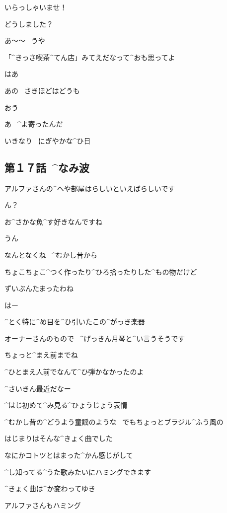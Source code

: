 \page
\Kokone いらっしゃいませ！

\Alpha どうしました？

\Ojisan あ〜〜
\ うや

\Ojisan 「^{きっさ}{喫茶}^{てん}{店}」みてえだなって^{おも}{思}ってよ

\Alpha はあ

\page
\Kokone あの
\ さきほどはどうも

\Ojisan おう

\Alpha あ
\ ^{よ}{寄}ったんだ

\Alpha いきなり
\ にぎやかな^{ひ}{日}


\subsection{第１７話\ ^{なみ}{波}}

\page[20]
\Kokone アルファさんの^{へや}{部屋}はらしいといえばらしいです

\page
\Alpha ん？

\Kokone お^{さかな}{魚}^{す}{好}きなんですね

\Alpha うん

\Alpha なんとなくね
\ ^{むかし}{昔}から

\page
\Alpha ちょこちょこ^{つく}{作}ったり^{ひろ}{拾}ったりした^{もの}{物}だけど

\Alpha ずいぶんたまったわね

\Kokone はー

\Kokone ^{とく}{特}に^{め}{目}を^{ひ}{引}いたこの^{がっき}{楽器}

\Kokone オーナーさんのもので
\ ^{げっきん}{月琴}と^{い}{言}うそうです

\page
\Alpha ちょっと^{まえ}{前}までね

\Alpha ^{ひとまえ}{人前}でなんて^{ひ}{弾}かなかったのよ

\Alpha ^{さいきん}{最近}だなー

\page
\Kokone ^{はじ}{初}めて^{み}{見}る^{ひょうじょう}{表情}

\page
\Kokone ^{むかし}{昔}の^{どうよう}{童謡}のような
\ でもちょっとブラジル^{ふう}{風}の

\Kokone はじまりはそんな^{きょく}{曲}でした

\page
\Kokone なにかコトツとはまった^{かん}{感}じがして

\Kokone ^{し}{知}ってる^{うた}{歌}みたいにハミングできます

\page
\Kokone ^{きょく}{曲}は^{か}{変}わってゆき

\Kokone アルファさんもハミング

